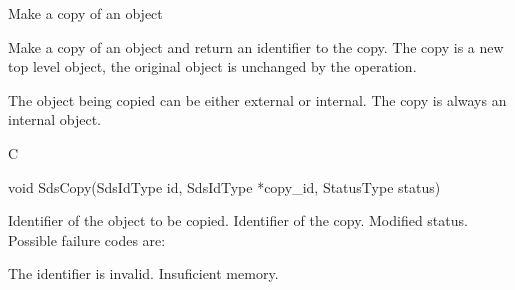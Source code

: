 \begin{manroutinedescription}
      Make a copy of an object

      Make a copy of an object and return an identifier to the copy.
      The copy is a new top level object, the original object is
      unchanged by the operation.

      The object being copied can be either external or internal.
      The copy is always an internal object.

      C

      void SdsCopy(SdsIdType id, SdsIdType *copy\_{}id, StatusType {\mantt{*}} %
{} status)
 
\begin{manparametertable}
  Identifier of the object to be %
copied.
 Identifier of the copy.
 Modified status. Possible %
failure codes are:
\end{manparametertable}
\begin{mantwocolumntable}
The identifier is invalid.
Insuficient memory.
\end{mantwocolumntable}
\end{manroutinedescription}
